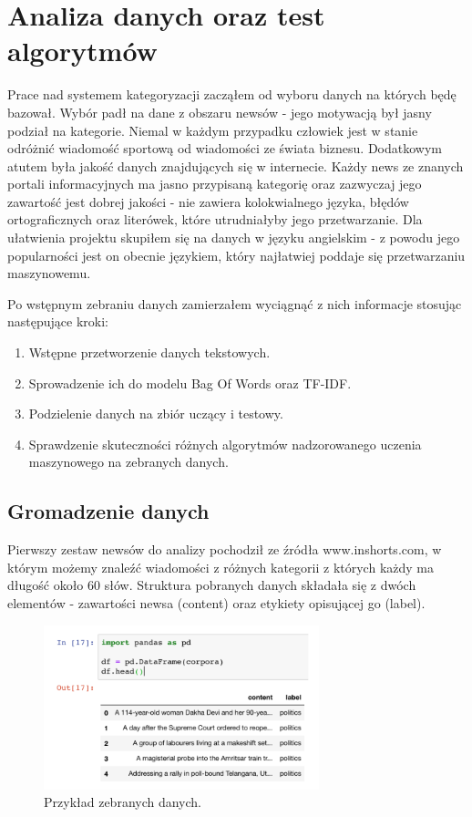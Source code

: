\chapter{Analiza danych oraz test algorytmów}
\label{cha:analizaDanych}

Prace nad systemem kategoryzacji zacząłem od wyboru danych na których będę bazował. Wybór padł na dane z obszaru newsów - jego motywacją był jasny podział na kategorie. Niemal w każdym przypadku człowiek jest w stanie odróżnić wiadomość sportową od wiadomości ze świata biznesu. Dodatkowym atutem była jakość danych znajdujących się w internecie. Każdy news ze znanych portali informacyjnych ma jasno przypisaną kategorię oraz zazwyczaj jego zawartość jest dobrej jakości - nie zawiera kolokwialnego języka, błędów ortograficznych oraz literówek, które utrudniałyby jego przetwarzanie. Dla ułatwienia projektu skupiłem się na danych w języku angielskim - z powodu jego popularności jest on obecnie językiem, który najłatwiej poddaje się przetwarzaniu maszynowemu.

Po wstępnym zebraniu danych zamierzałem wyciągnąć z nich informacje stosując następujące kroki:

\begin{enumerate}
    \item Wstępne przetworzenie danych tekstowych.
    \item Sprowadzenie ich do modelu Bag Of Words oraz TF-IDF.
    \item Podzielenie danych na zbiór uczący i testowy.
    \item Sprawdzenie skuteczności różnych algorytmów nadzorowanego uczenia maszynowego na zebranych danych.
\end{enumerate}


\section{Gromadzenie danych}
\label{sec:gromadzenieDanych}

Pierwszy zestaw newsów do analizy pochodził ze źródła www.inshorts.com, w którym możemy znaleźć wiadomości z różnych kategorii z których każdy ma długość około 60 słów. Struktura pobranych danych składała się z dwóch elementów - zawartości newsa (content) oraz etykiety opisującej go (label).

    \begin{figure}[H]
    \includegraphics[width=8cm]{content_example.png}
    \centering
    \caption{Przykład zebranych danych.}
    \end{figure} 
    
